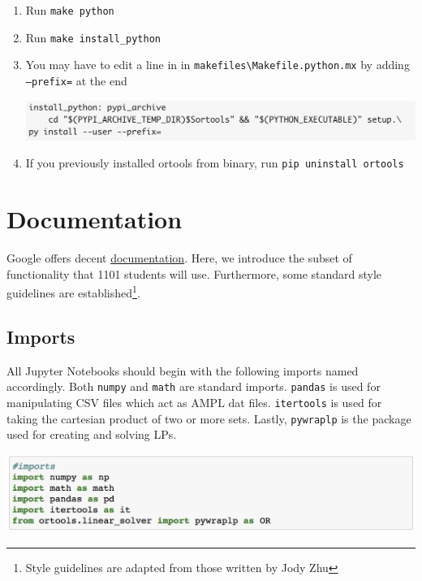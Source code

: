 \documentclass[11 pt]{article}
\newcommand{\code}[1]{\colorbox{gray!10}{\textcolor{black!85}{\texttt{#1}}}}
\begin{document}
\begin{enumerate}
\begin{center}
\end{center}
\item Run \code{make python}
\item Run \code{make install\_python}
\item You may have to edit a line in in \texttt{makefiles\textbackslash Makefile.python.mx} by adding \texttt{--prefix=} at the end 
\begin{center}
\includegraphics[scale=0.7]{images/MakefileLastStep.png}
\end{center}
\item If you previously installed ortools from binary, run \code{pip uninstall ortools}
\end{enumerate} 

\section{Documentation}

Google offers decent \href{https://developers.google.com/optimization/reference/python/linear_solver/pywraplp}{documentation}. Here, we introduce the subset of functionality that 1101 students will use. Furthermore, some standard style guidelines are established\footnote{Style guidelines are adapted from those written by Jody Zhu}.

\subsection{Imports}

All Jupyter Notebooks should begin with the following imports named accordingly. Both \texttt{numpy} and \texttt{math} are standard imports. \texttt{pandas} is used for manipulating CSV files which act as AMPL dat files. \texttt{itertools} is used for taking the cartesian product of two or more sets. Lastly, \texttt{pywraplp} is the package used for creating and solving LPs.
\begin{center}
\includegraphics[scale=0.7]{images/imports.png}
\end{center}
\end{document}
